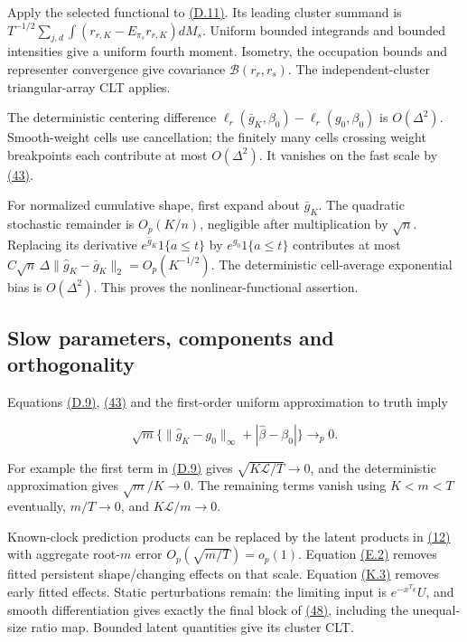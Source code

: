 \documentclass[11pt]{article}
\begin{document}
Apply the selected functional to \hyperref[eq:D.11]{(D.11)}. Its leading cluster summand is
\(T^{-1/2}\sum_{j,d}\int(r_{r,K}-E_{\pi_s}r_{r,K})dM_s\).
Uniform bounded integrands and bounded intensities give a uniform fourth moment. Isometry, the occupation bounds and representer convergence give covariance
\(\mathcal B(r_r,r_s)\). The independent-cluster triangular-array CLT applies.

The deterministic centering difference \(\ell_r(\bar g_K,\beta_0)-\ell_r(g_0,\beta_0)\) is \(O(\Delta^2)\). Smooth-weight cells use cancellation; the finitely many cells crossing weight breakpoints each contribute at most \(O(\Delta^2)\). It vanishes on the fast scale by \hyperref[eq:43]{(43)}.

For normalized cumulative shape, first expand about \(\bar g_K\).
The quadratic stochastic remainder is \(O_p(K/n)\), negligible after multiplication by \(\sqrt n\). Replacing its derivative \(e^{\bar g_K}1\{a\leq t\}\) by \(e^{g_0}1\{a\leq t\}\) contributes at most \(C\sqrt n\,\Delta\|\widehat g_K-\bar g_K\|_2=O_p(K^{-1/2})\). The deterministic cell-average exponential bias is \(O(\Delta^2)\). This proves the nonlinear-functional assertion.

\subsection{Slow parameters, components and orthogonality}\label{sec:E.2}

Equations \hyperref[eq:D.9]{(D.9)}, \hyperref[eq:43]{(43)} and the first-order uniform approximation to truth imply

\begin{equation*}
\sqrt m\{\|\widehat g_K-g_0\|_\infty
                +|\widehat\beta-\beta_0|\}\to_p0.
\tag{E.2}\label{eq:E.2}
\end{equation*}

For example the first term in \hyperref[eq:D.9]{(D.9)} gives \(\sqrt{K\mathscr L/T}\to0\), and the deterministic approximation gives \(\sqrt m/K\to0\). The remaining terms vanish using \(K<m<T\) eventually, \(m/T\to0\), and \(K\mathscr L/m\to0\).

Known-clock prediction products can be replaced by the latent products in \hyperref[eq:12]{(12)} with aggregate root-\(m\) error \(O_p(\sqrt{m/T})=o_p(1)\). Equation \hyperref[eq:E.2]{(E.2)} removes fitted persistent shape/changing effects on that scale. Equation \hyperref[eq:K.3]{(K.3)} removes early fitted effects. Static perturbations remain: the limiting input is \(e^{-x^T\epsilon}U\), and smooth differentiation gives exactly the final block of \hyperref[eq:48]{(48)}, including the unequal-size ratio map. Bounded latent quantities give its cluster CLT.
\end{document}
